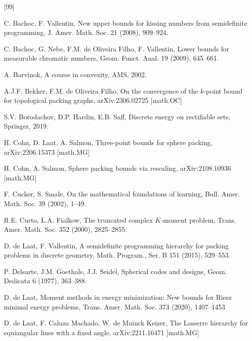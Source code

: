 \documentclass{amsart}
\begin{document}
\begin{thebibliography}{[99]}

C. Bachoc, F. Vallentin,
New upper bounds for kissing numbers from semidefinite programming, 
J. Amer. Math. Soc. 21 (2008), 909--924. 

C. Bachoc, G. Nebe, F.M. de Oliveira Filho, F. Vallentin, 
Lower bounds for measurable chromatic numbers, 
Geom. Funct. Anal. 19 (2009), 645--661.

  A. Barvinok,
  A course in convexity,
  AMS, 2002.

A.J.F. Bekker, F.M. de Oliveira Filho,
On the convergence of the $k$-point bound for topological packing graphs,
arXiv:2306.02725 [math.OC]

  S.V. Borodachov, D.P. Hardin, E.B. Saff,
  Discrete energy on rectifiable sets,
  Springer, 2019.
  
H. Cohn, D. Laat, A. Salmon,
Three-point bounds for sphere packing,
arXiv:2206.15373 [math.MG]

H. Cohn, A. Salmon,
Sphere packing bounds via rescaling,
arXiv:2108.10936 [math.MG]

  F. Cucker, S. Smale,
  On the mathematical foundations of learning,
  Bull. Amer. Math. Soc. 39 (2002), 1--49.

R.E. Curto, L.A. Fialkow,
The truncated complex $K$-moment problem,
Trans. Amer. Math. Soc. 352 (2000), 2825--2855.

D. de Laat, F. Vallentin,
A semidefinite programming hierarchy for packing problems in discrete
geometry,
Math. Program., Ser. B 151 (2015), 529--553.

P. Delsarte, J.M. Goethals,  J.J. Seidel,
Spherical codes and designs, 
Geom. Dedicata 6 (1977), 363--388.

D. de Laat,
Moment methods in energy minimization: New bounds for Riesz minimal energy problems,
Trans. Amer. Math. Soc. 373 (2020), 1407--1453

D. de Laat, F. Caluza Machado, W. de Muinck Keizer,
The Lasserre hierarchy for equiangular lines with a fixed angle,
arXiv:2211.16471 [math.MG]


\end{thebibliography}
\end{document}
